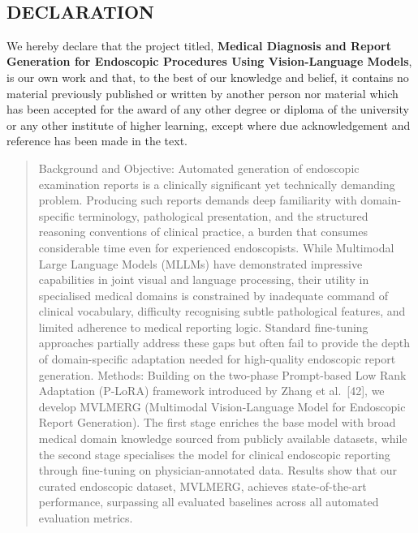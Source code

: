 ﻿﻿\documentclass[12pt]{report}
\begin{document}
\begin{spacing}{1.01}
\chapter*{DECLARATION}
We hereby declare that the project titled, \textbf{Medical Diagnosis and Report Generation for Endoscopic Procedures Using Vision-Language Models}, is our own work and that, to the best of our knowledge and belief, it contains no material previously published or written by another person nor material which has been accepted for the award of any other degree or diploma of the university or any other institute of higher learning, except where due acknowledgement and reference has been made in the text.\\

\vspace{2cm}
\newpage 

\begin{abstract}
Background and Objective: Automated generation of endoscopic examination reports is a clinically significant yet technically demanding problem. Producing such reports demands deep familiarity with domain-specific terminology, pathological presentation, and the structured reasoning conventions of clinical practice, a burden that consumes considerable time even for experienced endoscopists. While Multimodal Large Language Models (MLLMs) have demonstrated impressive capabilities in joint visual and language processing, their utility in specialised medical domains is constrained by inadequate command of clinical vocabulary, difficulty recognising subtle pathological features, and limited adherence to medical reporting logic. Standard fine-tuning approaches partially address these gaps but often fail to provide the depth of domain-specific adaptation needed for high-quality endoscopic report generation. Methods: Building on the two-phase Prompt-based Low Rank Adaptation (P-LoRA) framework introduced by Zhang et al.\ [42], we develop MVLMERG (Multimodal Vision-Language Model for Endoscopic Report Generation). The first stage enriches the base model with broad medical domain knowledge sourced from publicly available datasets, while the second stage specialises the model for clinical endoscopic reporting through fine-tuning on physician-annotated data. Results show that our curated endoscopic dataset, MVLMERG, achieves state-of-the-art performance, surpassing all evaluated baselines across all automated evaluation metrics.
\end{abstract}

\end{spacing}
\end{document}

